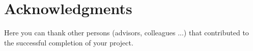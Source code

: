 \documentclass[fleqn,moreauthors,10pt]{ds_report}
\begin{document}

\section*{Acknowledgments}

Here you can thank other persons (advisors, colleagues ...) that contributed to the successful completion of your project.




\end{document}
